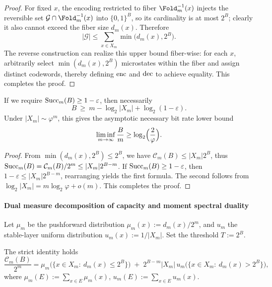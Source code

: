 \begin{proof}
For fixed \(x\), the encoding restricted to fiber \(\Fold_m^{-1}(x)\) injects the reversible set \(\mathcal{G}\cap \Fold_m^{-1}(x)\) into \(\{0,1\}^B\), so its cardinality is at most \(2^B\); clearly it also cannot exceed the fiber size \(d_m(x)\).
Therefore
\[
|\mathcal{G}|\le \sum_{x\in X_m}\min\bigl(d_m(x),2^B\bigr).
\]
The reverse construction can realize this upper bound fiber-wise: for each \(x\), arbitrarily select \(\min(d_m(x),2^B)\) microstates within the fiber and assign distinct codewords, thereby defining \({\rm enc}\) and \({\rm dec}\) to achieve equality. This completes the proof.
\end{proof}

\begin{corollary}\label{cor:fold-oracle-pigeonhole-bound}
If we require \({\rm Succ}_m(B)\ge 1-\varepsilon\), then necessarily
\[
B\ \ge\ m-\log_2|X_m|+\log_2(1-\varepsilon).
\]
Under \(|X_m|\sim \varphi^m\), this gives the asymptotic necessary bit rate lower bound
\[
\liminf_{m\to\infty}\frac{B}{m}\ge \log_2\Bigl(\frac{2}{\varphi}\Bigr).
\]
\end{corollary}

\begin{proof}
From \(\min(d_m(x),2^B)\le 2^B\), we have \(\mathcal{C}_m(B)\le |X_m|2^B\), thus
\(
{\rm Succ}_m(B)=\mathcal{C}_m(B)/2^m\le |X_m|2^{B-m}
\).
If \({\rm Succ}_m(B)\ge 1-\varepsilon\), then \(1-\varepsilon\le |X_m|2^{B-m}\), rearranging yields the first formula.
The second follows from \(\log_2|X_m|=m\log_2\varphi+o(m)\). This completes the proof.
\end{proof}

\paragraph{Dual measure decomposition of capacity and moment spectral duality}
Let \(\mu_m\) be the pushforward distribution \(\mu_m(x):=d_m(x)/2^m\), and \(u_m\) the stable-layer uniform distribution \(u_m(x):=1/|X_m|\).
Set the threshold \(T:=2^B\).

\begin{proposition}\label{prop:fold-oracle-capacity-bimeasure-identity}
The strict identity holds
\[
\frac{\mathcal{C}_m(B)}{2^m}
=\mu_m\bigl(\{x\in X_m:\ d_m(x)\le 2^B\}\bigr)
\;+\;2^{B-m}|X_m|\,u_m\bigl(\{x\in X_m:\ d_m(x)>2^B\}\bigr),
\]
where \(\mu_m(E):=\sum_{x\in E}\mu_m(x)\), \(u_m(E):=\sum_{x\in E}u_m(x)\).
\end{proposition}

